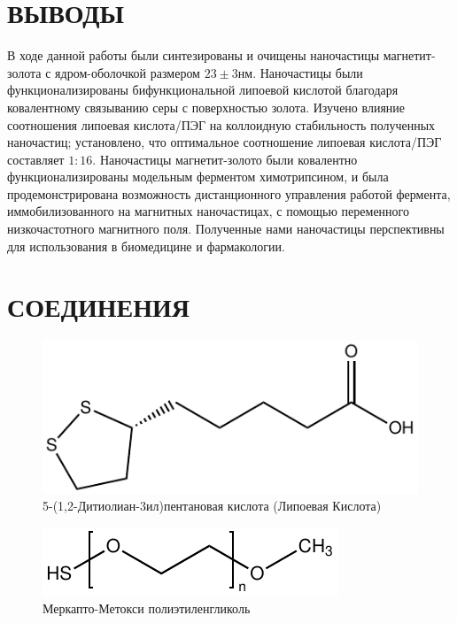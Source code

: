 \documentclass[10pt, a4paper]{article}
\begin{document}
\section*{ВЫВОДЫ}
В ходе данной работы были синтезированы и очищены наночастицы магнетит-золота с ядром-оболочкой размером \(23 \pm 3 \text{нм}\). Наночастицы были функционализированы бифункциональной липоевой кислотой благодаря ковалентному связыванию серы с поверхностью золота. Изучено влияние соотношения липоевая кислота/ПЭГ на коллоидную стабильность полученных наночастиц; установлено, что оптимальное соотношение липоевая кислота/ПЭГ составляет \(1: 16\). Наночастицы магнетит-золото были ковалентно функционализированы модельным ферментом химотрипсином, и была продемонстрирована возможность дистанционного управления работой фермента, иммобилизованного на магнитных наночастицах, с помощью переменного низкочастотного магнитного поля. Полученные нами наночастицы перспективны для использования в биомедицине и фармакологии.

\section*{СОЕДИНЕНИЯ}

\begin{figure}[ht!]
  \centering
  \includegraphics[scale=1]{lipoic.pdf}
  \captionsetup{labelformat=empty}
  \caption{5-(1,2-Дитиолиан-3ил)пентановая кислота (Липоевая Кислота)}
\end{figure}

\begin{figure}[ht!]
  \centering
  \includegraphics[scale=1]{hspegoch.pdf}
  \captionsetup{labelformat=empty}
  \caption{Меркапто-Метокси полиэтиленгликоль}
\end{figure}
\end{document}
